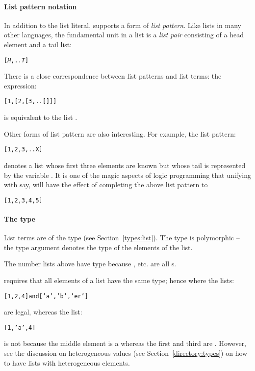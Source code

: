 \paragraph{List pattern notation}
In addition to the list literal, \go supports a form of \emph{list pattern}. Like lists in many other languages, the fundamental unit in a list is a \emph{list pair} consisting of a head element and a tail list:
\begin{alltt}
[\emph{H},..\emph{T}]
\end{alltt}
There is a close correspondence between list patterns and list terms: the expression:
\begin{alltt}
[1,[2,[3,..[]]]
\end{alltt}
is equivalent to the list \q{[1,2,3]}.

Other forms of list pattern are also interesting. For example, the list pattern:
\begin{alltt}
[1,2,3,..X]
\end{alltt}
denotes a list whose first three elements are known but whose tail is represented by the variable . It is one of the magic aspects of logic programming that unifying  with \q{[4,5]} say, will have the effect of completing the above list pattern to
\begin{alltt}
[1,2,3,4,5]
\end{alltt}

\paragraph{The  type}
List terms are of the  type (see Section~\vref{types:list}). The  type is polymorphic -- the type argument denotes the type of the elements of the list.

The number lists above have type  because , etc. are all s.

\go requires that all elements of a list have the same type; hence where the lists:
\begin{alltt}
[1,2,4] \mbox{\rm and} ['a','b','er']
\end{alltt}
are legal, whereas the list:
\begin{alltt}
[1,'a',4]
\end{alltt}
is not because the middle element is a  whereas the first and third are . However, see the discussion on heterogeneous values (see Section~\vref{directory:types}) on how to have lists with heterogeneous elements.

